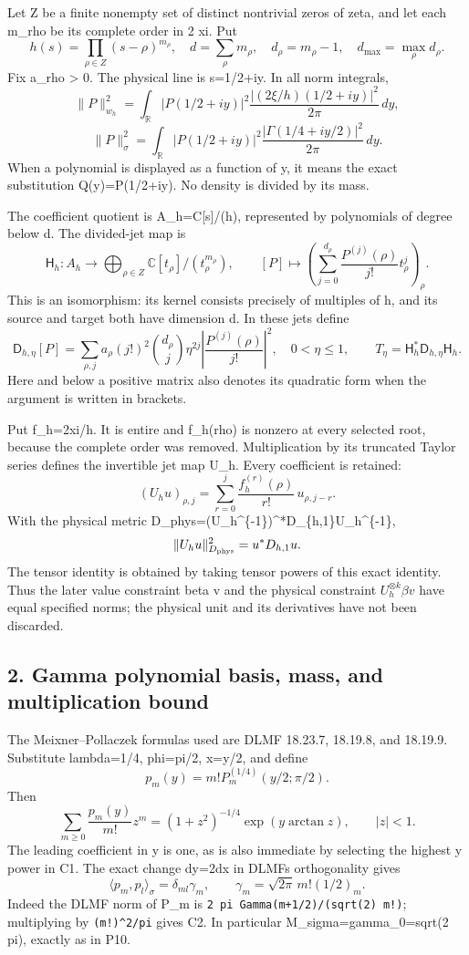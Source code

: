 \documentclass[11pt]{article}
\begin{document}
Let Z be a finite nonempty set of distinct nontrivial zeros of zeta, and let each m\_rho be its complete order in 2 xi. Put \[
h(s)=\prod_{\rho\in Z}(s-\rho)^{m_\rho},\quad
d=\sum_\rho m_\rho,\quad d_\rho=m_\rho-1,\quad
d_{\max}=\max_\rho d_\rho.
\] Fix a\_rho \textgreater{} 0. The physical line is s=1/2+iy. In all norm integrals, \[
\|P\|_{w_h}^2=\int_{\mathbb R}|P(1/2+iy)|^2
 \frac{|(2\xi/h)(1/2+iy)|^2}{2\pi}\,dy,
\] \[
\|P\|_\sigma^2=\int_{\mathbb R}|P(1/2+iy)|^2
 \frac{|\Gamma(1/4+iy/2)|^2}{2\pi}\,dy.
\] When a polynomial is displayed as a function of y, it means the exact substitution Q(y)=P(1/2+iy). No density is divided by its mass.

The coefficient quotient is A\_h=C{[}s{]}/(h), represented by polynomials of degree below d. The divided-jet map is \[
\mathsf H_h:A_h\longrightarrow
 \bigoplus_{\rho\in Z}\mathbb C[t_\rho]/(t_\rho^{m_\rho}),\qquad
[P]\longmapsto\left(\sum_{j=0}^{d_\rho}
 \frac{P^{(j)}(\rho)}{j!}t_\rho^j\right)_\rho.
\] This is an isomorphism: its kernel consists precisely of multiples of h, and its source and target both have dimension d. In these jets define \[
\mathsf D_{h,\eta}[P]=\sum_{\rho,j}
a_\rho(j!)^2\binom{d_\rho}{j}\eta^{2j}
\left|\frac{P^{(j)}(\rho)}{j!}\right|^2,
\quad 0<\eta\le1,
\qquad T_\eta=\mathsf H_h^*\mathsf D_{h,\eta}\mathsf H_h.
\] Here and below a positive matrix also denotes its quadratic form when the argument is written in brackets.

Put f\_h=2xi/h. It is entire and f\_h(rho) is nonzero at every selected root, because the complete order was removed. Multiplication by its truncated Taylor series defines the invertible jet map U\_h. Every coefficient is retained: \[
(U_h u)_{\rho,j}=\sum_{r=0}^j
 \frac{f_h^{(r)}(\rho)}{r!}\,u_{\rho,j-r}.
\] With the physical metric D\_phys=(U\_h\^{}\{-1\})\^{}*D\_\{h,1\}U\_h\^{}\{-1\}, \[
\|U_hu\|_{D_{\rm phys}}^2=u^*D_{h,1}u.
\] The tensor identity is obtained by taking tensor powers of this exact identity. Thus the later value constraint beta v and the physical constraint \(U_h^{\otimes k}\beta v\) have equal specified norms; the physical unit and its derivatives have not been discarded.

\subsection{2. Gamma polynomial basis, mass, and multiplication bound}\label{gamma-polynomial-basis-mass-and-multiplication-bound}

The Meixner--Pollaczek formulas used are DLMF 18.23.7, 18.19.8, and 18.19.9. Substitute lambda=1/4, phi=pi/2, x=y/2, and define \[
p_m(y)=m!P_m^{(1/4)}(y/2;\pi/2).
\] Then \[
\sum_{m\ge0}\frac{p_m(y)}{m!}z^m
 =(1+z^2)^{-1/4}\exp(y\arctan z),\qquad |z|<1.
\tag{C1}
\] The leading coefficient in y is one, as is also immediate by selecting the highest y power in C1. The exact change dy=2dx in DLMF\textquotesingle s orthogonality gives \[
\langle p_m,p_l\rangle_\sigma=\delta_{ml}\gamma_m,
\qquad
\gamma_m=\sqrt{2\pi}\,m!(1/2)_m.
\tag{C2}
\] Indeed the DLMF norm of P\_m is \texttt{2\ pi\ Gamma(m+1/2)/(sqrt(2)\ m!)}; multiplying by \texttt{(m!)\^{}2/pi} gives C2. In particular M\_sigma=gamma\_0=sqrt(2 pi), exactly as in P10.
\end{document}
